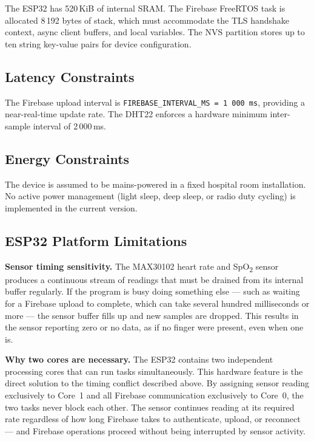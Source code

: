The ESP32 has 520\,KiB of internal SRAM.
The Firebase FreeRTOS task is allocated 8\,192 bytes of stack, which must accommodate
the TLS handshake context, async client buffers, and local variables.
The NVS partition stores up to ten string key-value pairs for device configuration.

\subsection*{Latency Constraints}

The Firebase upload interval is \texttt{FIREBASE\_INTERVAL\_MS = 1\,000\,ms},
providing a near-real-time update rate.
The DHT22 enforces a hardware minimum inter-sample interval of 2\,000\,ms.


\subsection*{Energy Constraints}

The device is assumed to be mains-powered in a fixed hospital room installation.
No active power management (light sleep, deep sleep, or radio duty cycling) is
implemented in the current version.

\subsection*{ESP32 Platform Limitations}

\textbf{Sensor timing sensitivity.}
The MAX30102 heart rate and SpO\textsubscript{2} sensor produces a continuous stream
of readings that must be drained from its internal buffer regularly.
If the program is busy doing something else — such as waiting for a Firebase upload
to complete, which can take several hundred milliseconds or more — the sensor buffer
fills up and new samples are dropped.
This results in the sensor reporting zero or no data, as if no finger were present,
even when one is.

\textbf{Why two cores are necessary.}
The ESP32 contains two independent processing cores that can run tasks simultaneously.
This hardware feature is the direct solution to the timing conflict described above.
By assigning sensor reading exclusively to Core~1 and all Firebase communication
exclusively to Core~0, the two tasks never block each other.
The sensor continues reading at its required rate regardless of how long Firebase
takes to authenticate, upload, or reconnect — and Firebase operations proceed without
being interrupted by sensor activity.
